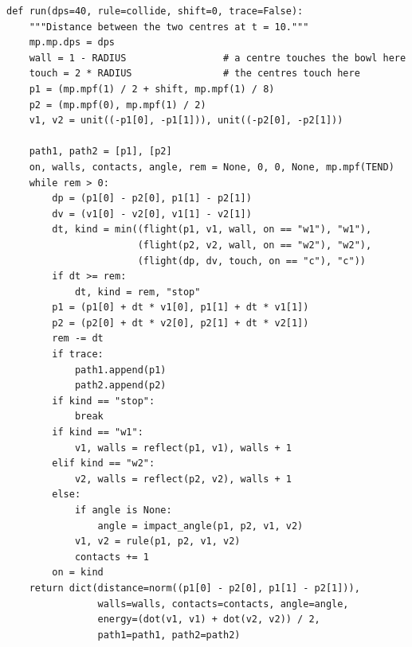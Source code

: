 \begin{verbatim}
def run(dps=40, rule=collide, shift=0, trace=False):
    """Distance between the two centres at t = 10."""
    mp.mp.dps = dps
    wall = 1 - RADIUS                 # a centre touches the bowl here
    touch = 2 * RADIUS                # the centres touch here
    p1 = (mp.mpf(1) / 2 + shift, mp.mpf(1) / 8)
    p2 = (mp.mpf(0), mp.mpf(1) / 2)
    v1, v2 = unit((-p1[0], -p1[1])), unit((-p2[0], -p2[1]))

    path1, path2 = [p1], [p2]
    on, walls, contacts, angle, rem = None, 0, 0, None, mp.mpf(TEND)
    while rem > 0:
        dp = (p1[0] - p2[0], p1[1] - p2[1])
        dv = (v1[0] - v2[0], v1[1] - v2[1])
        dt, kind = min((flight(p1, v1, wall, on == "w1"), "w1"),
                       (flight(p2, v2, wall, on == "w2"), "w2"),
                       (flight(dp, dv, touch, on == "c"), "c"))
        if dt >= rem:
            dt, kind = rem, "stop"
        p1 = (p1[0] + dt * v1[0], p1[1] + dt * v1[1])
        p2 = (p2[0] + dt * v2[0], p2[1] + dt * v2[1])
        rem -= dt
        if trace:
            path1.append(p1)
            path2.append(p2)
        if kind == "stop":
            break
        if kind == "w1":
            v1, walls = reflect(p1, v1), walls + 1
        elif kind == "w2":
            v2, walls = reflect(p2, v2), walls + 1
        else:
            if angle is None:
                angle = impact_angle(p1, p2, v1, v2)
            v1, v2 = rule(p1, p2, v1, v2)
            contacts += 1
        on = kind
    return dict(distance=norm((p1[0] - p2[0], p1[1] - p2[1])),
                walls=walls, contacts=contacts, angle=angle,
                energy=(dot(v1, v1) + dot(v2, v2)) / 2,
                path1=path1, path2=path2)
\end{verbatim}
